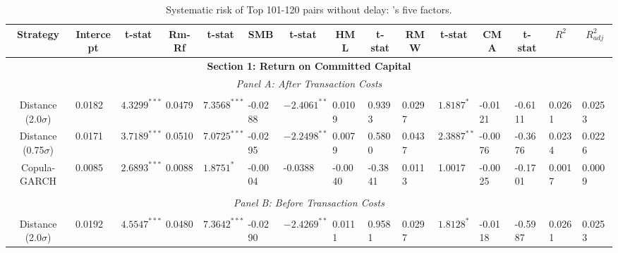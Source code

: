 \documentclass[a4paper]{article}
\begin{document}
	\begin{sidewaystable}
		\caption{Systematic risk of Top 101-120 pairs without delay: \citet*{ff15}'s five factors.}
		\begin{threeparttable}[H]
			\centering \scriptsize
			\begin{tabularx}{\textwidth}{@{\extracolsep{\fill}}lllllllllllllll@{}}
				\toprule
				\multicolumn{1}{c}{Strategy} & \multicolumn{1}{c}{Intercept} & \multicolumn{1}{c}{t-stat} & \multicolumn{1}{c}{Rm-Rf} & \multicolumn{1}{c}{t-stat} & \multicolumn{1}{c}{SMB} & \multicolumn{1}{c}{t-stat} & \multicolumn{1}{c}{HML} & \multicolumn{1}{c}{t-stat} & \multicolumn{1}{c}{RMW} & \multicolumn{1}{c}{t-stat} & \multicolumn{1}{c}{CMA} & \multicolumn{1}{c}{t-stat} & \multicolumn{1}{c}{$R^{2}$} & \multicolumn{1}{c}{$R^{2}_{adj}$} \\
				\midrule
				\multicolumn{15}{c}{\textbf{Section 1: Return on Committed Capital}} \\
				\multicolumn{15}{c}{\textit{Panel A: After Transaction Costs}} \\
				\multicolumn{1}{c}{} & \multicolumn{1}{c}{} & \multicolumn{1}{c}{} & \multicolumn{1}{c}{} & \multicolumn{1}{c}{} & \multicolumn{1}{c}{} & \multicolumn{1}{c}{} & \multicolumn{1}{c}{} &       &       &       &       &       &       &  \\
				\multicolumn{1}{c}{Distance (2.0$\sigma$)} & 0.0182 & $4.3299^{***}$ & 0.0479 & $7.3568^{***}$ & -0.0288 & $-2.4061^{**}$ & 0.0109 & 0.9393 & 0.0297 & $1.8187^{*}$ & -0.0121 & -0.6111 & 0.0261 & 0.0253 \\
				\multicolumn{1}{c}{Distance (0.75$\sigma$)} & 0.0171 & $3.7189^{***}$ & 0.0510 & $7.0725^{***}$ & -0.0295 & $-2.2498^{**}$ & 0.0079 & 0.5800 & 0.0437 & $2.3887^{**}$ & -0.0076 & -0.3676 & 0.0234 & 0.0226 \\
				\multicolumn{1}{c}{Copula-GARCH} & 0.0085 & $2.6893^{***}$ & 0.0088 & $1.8751^{*}$ & -0.0004 & -0.0388 & -0.0040 & -0.3841 & 0.0113 & 1.0017 & -0.0025 & -0.1701 & 0.0017 & 0.0009 \\
				&       &       &       &       &       &       &       &       &       &       &       &       &       &  \\
				\multicolumn{15}{c}{\textit{Panel B: Before Transaction Costs}} \\
				&       &       &       &       &       &       &       &       &       &       &       &       &       &  \\
				\multicolumn{1}{c}{Distance (2.0$\sigma$)} & 0.0192 & $4.5547^{***}$ & 0.0480 & $7.3642^{***}$ & -0.0290 & $-2.4269^{**}$ & 0.0111 & 0.9581 & 0.0297 & $1.8128^{*}$ & -0.0118 & -0.5987 & 0.0261 & 0.0253 \\

\end{tabularx}
\end{threeparttable}
\end{sidewaystable}
\end{document}
